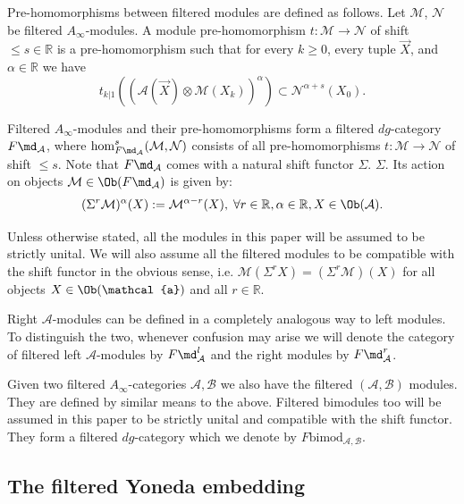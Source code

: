Pre-homomorphisms between filtered modules are defined as follows. Let
$\mathcal{M}$, $\mathcal{N}$ be filtered $A_{\infty}$-modules. A
module pre-homomorphism $t: \mathcal{M} \longrightarrow \mathcal{N}$
of shift $\leq s \in \mathbb{R}$ is a pre-homomorphism such that for
every $k \geq 0$, every tuple $\vec{X}$, and $\alpha \in \mathbb{R}$ 
we have
$$t_{k|1}( (\mathcal{A}(\vec{X}) \otimes
\mathcal{M}(X_k))^{\alpha}) \subset \mathcal{N}^{\alpha + s}(X_0).$$

Filtered $A_{\infty}$-modules and their pre-homomorphisms form a
filtered $dg$-category $F\md_{\mathcal{A}}$, where
$\hom^{s}_{F\md_{\mathcal{A}}}(\mathcal{M}, \mathcal{N})$ consists of
all pre-homomorphisms $t: \mathcal{M} \longrightarrow \mathcal{N}$ of
shift $\leq s$. Note that $F\md_{\mathcal{A}}$ comes with a natural shift functor $\Sigma$.
$\Sigma$. Its action on objects
$\mathcal{M} \in \Ob(F\md_{\mathcal{A}})$ is given by:
$$(\Sigma^r \mathcal{M})^{\alpha}(X) := \mathcal{M}^{\alpha-r}(X),
\; \forall r \in \mathbb{R}, \alpha \in \mathbb{R}, X \in
\Ob(\mathcal{A}).$$

Unless otherwise stated, all the modules in this paper will be assumed
to be strictly unital. We will also assume all the filtered modules to
be compatible with the shift functor in the obvious sense, i.e. $\mathcal{M}(\Sigma^rX) = (\Sigma^r\mathcal{M})(X)$ for all objects $X\in \Ob(\mathcal{a})$ and all $r\in \mathbb{R}$.

Right $\mathcal{A}$-modules can be defined in a completely analogous
way to left modules. To distinguish the two, whenever confusion may
arise we will denote the category of filtered left $\mathcal{A}$-modules by
$F\md^l_{\mathcal{A}}$ and the right modules by
$F\md^r_{\mathcal{A}}$.

Given two filtered $A_{\infty}$-categories $\mathcal{A}, \mathcal{B}$
we also have the filtered $(\mathcal{A}, \mathcal{B})$ modules. They
are defined by similar means to the above. Filtered bimodules too will
be assumed in this paper to be strictly unital and compatible with the
shift functor. They form a filtered $dg$-category which we
denote by $F\text{bimod}_{\mathcal{A}, \mathcal{B}}$.


\subsection{The filtered Yoneda embedding}



